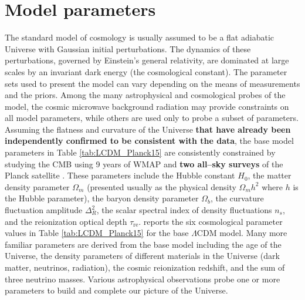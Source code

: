 \documentclass[a4wide,12pt]{book}
\begin{document}
{\section{Model parameters}
\label{subsec:Model_parameters}
The standard model of cosmology is usually assumed to be a flat adiabatic Universe with Gaussian initial perturbations.  The dynamics of these perturbations, governed by Einstein's general relativity, are dominated at large scales by an invariant dark energy (the cosmological constant). The parameter sets used to present the model can vary depending on the means of measurements and the priors. Among the many astrophysical and cosmological probes of the model, the cosmic microwave background radiation may provide constraints on all model parameters, while others are used only to probe a subset of parameters. Assuming the flatness and curvature of the Universe {\bf that have already been independently confirmed to be consistent with the data}, the base model parameters in Table \ref{tab:LCDM_Planck15} are consistently constrained by studying the CMB using 9 years of WMAP \citep[][]{WMAP9} and {\bf two all--sky surveys} of the Planck satellite \citep[][]{Planck2015}. These parameters include the Hubble constant $H_0$, the matter density parameter $\Omega_m$ (presented usually as the physical density $\Omega_m h^2$ where $h$ is the Hubble parameter), the baryon density parameter $\Omega_b$, the curvature fluctuation amplitude $\Delta^2_R$, the scalar spectral index of density fluctuations $n_s$, and the reionization optical depth $\tau_\mathrm{re}$. \citet[][]{Planck2015} reports the six cosmological parameter values in Table \ref{tab:LCDM_Planck15} for the base $\Lambda$CDM model. Many more familiar parameters are derived from the base model including the age of the Universe, the density parameters of different materials in the Universe (dark matter, neutrinos, radiation), the cosmic reionization redshift, and the sum of three neutrino masses. Various astrophysical observations probe one or more parameters to build and complete our picture of the Universe.

}
\end{document}
